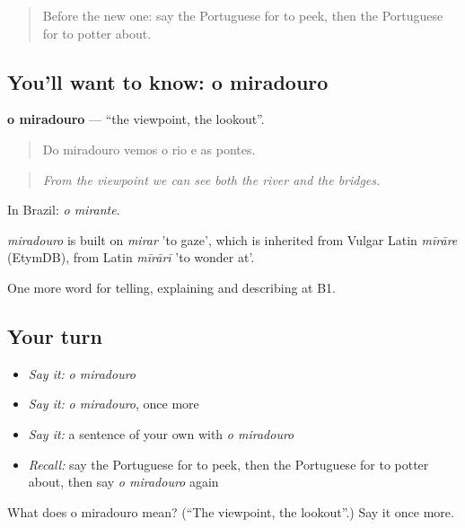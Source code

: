 \label{lesson:PT-C447-miradouro}



\begin{quote}
Before the new one: say the Portuguese for to peek, then the Portuguese for to potter about.
\end{quote}

\subsection*{You'll want to know: o miradouro}
\textbf{o miradouro} — \textquotedblleft{}the viewpoint, the lookout\textquotedblright{}.

\begin{quote}
Do miradouro vemos o rio e as pontes.
\end{quote}

\begin{quote}
\emph{From the viewpoint we can see both the river and the bridges.}
\end{quote}

In Brazil: \emph{o mirante}.

\begin{cousinweb}
\emph{miradouro} is built on \emph{mirar} 'to gaze', which is inherited from Vulgar Latin \emph{mīrāre} (EtymDB), from Latin \emph{mīrārī} 'to wonder at'.
\end{cousinweb}

\begin{grammarlens}[title={What you've built}]
One more word for telling, explaining and describing at B1.
\end{grammarlens}

\subsection*{Your turn}
\begin{itemize}
\raggedright
  \item \emph{Say it:} \emph{o miradouro}
  \item \emph{Say it:} \emph{o miradouro}, once more
  \item \emph{Say it:} a sentence of your own with \emph{o miradouro}
  \item \emph{Recall:} say the Portuguese for to peek, then the Portuguese for to potter about, then say \emph{o miradouro} again
\end{itemize}

\begin{tcolorbox}[breakable,colback=teal!4,colframe=teal!35!black,title={Before you move on}]
What does o miradouro mean? (\textquotedblleft{}The viewpoint, the lookout\textquotedblright{}.) Say it once more.
\end{tcolorbox}
